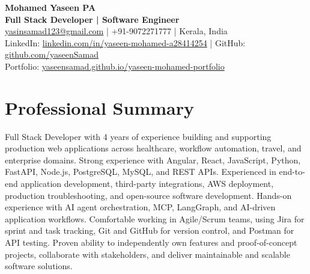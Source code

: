 \documentclass[10pt,a4paper]{article}
\begin{document}
\begin{center}
    {\LARGE \textbf{Mohamed Yaseen PA}} \\[3pt]
    {\normalsize \textbf{Full Stack Developer | Software Engineer}} \\[4pt]

    \href{mailto:yasinsamad123@gmail.com}{yasinsamad123@gmail.com}
    \;|\;
    +91-9072271777
    \;|\;
    Kerala, India
    \\[3pt]

    LinkedIn:
    \href{https://www.linkedin.com/in/yaseen-mohamed-a28414254/}
    {linkedin.com/in/yaseen-mohamed-a28414254}
    \;|\;
    GitHub:
    \href{https://github.com/yaseenSamad}
    {github.com/yaseenSamad}
    \\[3pt]

    Portfolio:
    \href{https://yaseensamad.github.io/yaseen-mohamed-portfolio/}
    {yaseensamad.github.io/yaseen-mohamed-portfolio}
\end{center}

\section*{Professional Summary}

Full Stack Developer with 4 years of experience building and supporting production web applications across healthcare, workflow automation, travel, and enterprise domains. Strong experience with Angular, React, JavaScript, Python, FastAPI, Node.js, PostgreSQL, MySQL, and REST APIs. Experienced in end-to-end application development, third-party integrations, AWS deployment, production troubleshooting, and open-source software development. Hands-on experience with AI agent orchestration, MCP, LangGraph, and AI-driven application workflows. Comfortable working in Agile/Scrum teams, using Jira for sprint and task tracking, Git and GitHub for version control, and Postman for API testing. Proven ability to independently own features and proof-of-concept projects, collaborate with stakeholders, and deliver maintainable and scalable software solutions.

\end{document}
